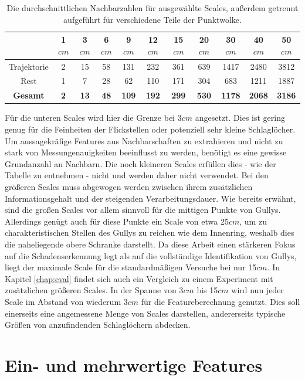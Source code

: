 \begin{table}
\centering
\begin{tabular}{c|c|c|c|c|c|c|c|c|c|c}
 & 1$cm$ & 3$cm$ & 6$cm$ & 9$cm$ & 12$cm$ & 15$cm$ & 20$cm$ & 30$cm$ & 40$cm$ & 50$cm$ \\
\hline
Trajektorie & 2 & 15 & 58 & 131 & 232 & 361 & 639 & 1417 & 2480 & 3812 \\
Rest        & 1 &  7 & 28 &  62 & 110 & 171 & 304 &  683 & 1211 & 1887 \\
\hline
\textbf{Gesamt} & \textbf{2} & \textbf{13} & \textbf{48} & \textbf{109} & \textbf{192} & \textbf{299} & \textbf{530} & \textbf{1178} & \textbf{2068} & \textbf{3186} \\
\end{tabular}
\caption{Die durchschnittlichen Nachbarzahlen für ausgewählte Scales, außerdem getrennt aufgeführt für verschiedene Teile der Punktwolke.}
\label{table:neighbor_counts}
\end{table}

Für die unteren Scales wird hier die Grenze bei 3$cm$ angesetzt. Dies ist gering genug für die Feinheiten der Flickstellen oder potenziell sehr kleine Schlaglöcher. Um aussagekräfige Features aus Nachbarschaften zu extrahieren und nicht zu stark von Messungenauigkeiten beeinflusst zu werden, benötigt es eine gewisse Grundanzahl an Nachbarn. Die noch kleineren Scales erfüllen dies - wie der Tabelle zu entnehmen - nicht und werden daher nicht verwendet. Bei den größeren Scales muss abgewogen werden zwischen ihrem zusätzlichen Informationsgehalt und der steigenden Verarbeitungsdauer. Wie bereits erwähnt, sind die großen Scales vor allem sinnvoll für die mittigen Punkte von Gullys. Allerdings genügt auch für diese Punkte ein Scale von etwa 25$cm$, um zu charakteristischen Stellen des Gullys zu reichen wie dem Innenring, weshalb dies die naheliegende obere Schranke darstellt. Da diese Arbeit einen stärkeren Fokus auf die Schadenserkennung legt als auf die vollständige Identifikation von Gullys, liegt der maximale Scale für die standardmäßigen Versuche bei nur 15$cm$. In Kapitel \ref{chap:eval} findet sich auch ein Vergleich zu einem Experiment mit zusätzlichen größeren Scales. In der Spanne von 3$cm$ bis 15$cm$ wird nun jeder Scale im Abstand von wiederum 3$cm$ für die Featureberechnung genutzt. Dies soll einerseits eine angemessene Menge von Scales darstellen, andererseits typische Größen von anzufindenden Schlaglöchern abdecken.

\section{Ein- und mehrwertige Features}

